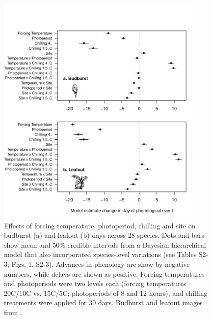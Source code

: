\documentclass[11pt]{article}
\begin{document}
\begin{figure}[h!]
\centering
\noindent \includegraphics[width=0.9\textwidth]{images/Fig1_bb_lo.pdf}
\caption{Effects of forcing temperature, photoperiod, chilling and site on budburst (a) and leafout (b) days across 28 species. Dots and bars show mean and 50\% credible intervals from a Bayesian hierarchical model that also incorporated species-level variations (see Tables S2-3; Figs. 1, S2-3). Advances in phenology are show by negative numbers, while delays are shown as positive. Forcing temperatures and photoperiods were two levels each (forcing temperatures 20\degree C/10\degree C vs. 15\degree C/5\degree C; photoperiods of 8 and 12 hours), and chilling treatments were applied for 30 days. Budburst and leafout images from \citet{Finn:2007}.}
\label{fig:maineff}
\end{figure}
\end{document}
